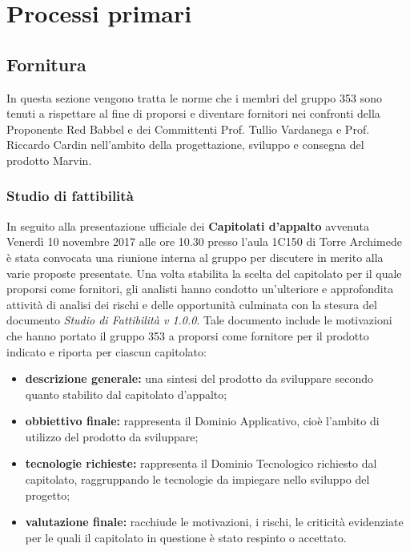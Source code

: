 \documentclass[NormeDiProgetto.tex]{subfiles}
\begin{document}
\chapter{Processi primari}
\section{Fornitura}
In questa sezione vengono tratta le norme che i membri del gruppo 353 sono tenuti a rispettare al fine di proporsi e diventare fornitori nei confronti della Proponente Red Babbel e dei Committenti Prof. Tullio Vardanega e Prof. Riccardo Cardin nell'ambito della progettazione, sviluppo e consegna del prodotto Marvin.
\subsection{Studio di fattibilità}
In seguito alla presentazione ufficiale dei \textbf{Capitolati d'appalto} avvenuta Venerdì 10 novembre 2017 alle ore 10.30 presso l'aula 1C150 di Torre Archimede è stata convocata una riunione interna al gruppo per discutere in merito alla varie proposte presentate. Una volta stabilita la scelta del capitolato per il quale proporsi come fornitori, gli analisti hanno condotto un'ulteriore e approfondita attività di analisi dei rischi e delle opportunità culminata con la stesura del documento \textit{Studio di Fattibilità v 1.0.0}. Tale documento include le motivazioni che hanno portato il gruppo 353 a proporsi come fornitore per il prodotto indicato e riporta per ciascun capitolato:
\begin{itemize}
	\item \textbf{descrizione generale:} una sintesi del prodotto da sviluppare secondo quanto stabilito dal capitolato d'appalto;
	\item \textbf{obbiettivo finale:} rappresenta il Dominio Applicativo, cioè l'ambito di utilizzo del prodotto da sviluppare;
	\item \textbf{tecnologie richieste:} rappresenta il Dominio Tecnologico richiesto dal capitolato, raggruppando le tecnologie da impiegare nello sviluppo del progetto;
	\item \textbf{valutazione finale:} racchiude le motivazioni, i rischi, le criticità evidenziate per le quali il capitolato in questione è stato respinto o accettato.
\end{itemize}
\end{document}
